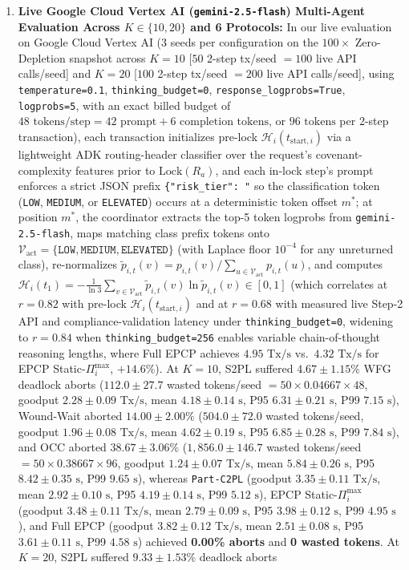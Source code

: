 \documentclass[conference,10pt]{IEEEtran}
\begin{document}
\begin{enumerate}
    \item \textbf{Live Google Cloud Vertex AI (\texttt{gemini-2.5-flash}) Multi-Agent Evaluation Across $K \in \{10, 20\}$ and 6 Protocols:} In our live evaluation on Google Cloud Vertex AI (3 seeds per configuration on the $100\times$ Zero-Depletion snapshot across $K=10$ [$50$ 2-step tx/seed $= 100$ live API calls/seed] and $K=20$ [$100$ 2-step tx/seed $= 200$ live API calls/seed], using \texttt{temperature=0.1}, \texttt{thinking\_\allowbreak budget=0}, \texttt{response\_\allowbreak logprobs=True}, \texttt{logprobs=5}, with an exact billed budget of $48\text{ tokens/step} = 42\text{ prompt} + 6\text{ completion tokens}$, or $96\text{ tokens}$ per 2-step transaction), each transaction initializes pre-lock $\mathcal{H}_i(t_{\text{start},i})$ via a lightweight ADK routing-header classifier over the request's covenant-complexity features prior to $\text{Lock}(R_a)$, and each in-lock step's prompt enforces a strict JSON prefix \texttt{\{"risk\_tier": "} so the classification token (\texttt{LOW}, \texttt{MEDIUM}, or \texttt{ELEVATED}) occurs at a deterministic token offset $m^*$; at position $m^*$, the coordinator extracts the top-5 token logprobs from \texttt{gemini-2.5-flash}, maps matching class prefix tokens onto $\mathcal{V}_{\text{act}} = \{\texttt{LOW}, \texttt{MEDIUM}, \texttt{ELEVATED}\}$ (with Laplace floor $10^{-4}$ for any unreturned class), re-normalizes $\tilde{p}_{i,t}(v) = p_{i,t}(v)/\sum_{u \in \mathcal{V}_{\text{act}}} p_{i,t}(u)$, and computes $\mathcal{H}_i(t_1) = -\frac{1}{\ln 3}\sum_{v \in \mathcal{V}_{\text{act}}} \tilde{p}_{i,t}(v)\ln \tilde{p}_{i,t}(v) \in [0, 1]$ (which correlates at $r=0.82$ with pre-lock $\mathcal{H}_i(t_{\text{start},i})$ and at $r=0.68$ with measured live Step-2 API and compliance-validation latency under \texttt{thinking\_budget=0}, widening to $r=0.84$ when \texttt{thinking\_budget=256} enables variable chain-of-thought reasoning lengths, where Full EPCP achieves $4.95\text{ Tx/s}$ vs.\ $4.32\text{ Tx/s}$ for EPCP Static-$\Pi_i^{\max}$, $+14.6\%$). At $K=10$, S2PL suffered $4.67 \pm 1.15\%$ WFG deadlock aborts ($112.0 \pm 27.7$ wasted tokens/seed $= 50\times 0.04667\times 48$, goodput $2.28 \pm 0.09\text{ Tx/s}$, mean $4.18 \pm 0.14\text{ s}$, P95 $6.31 \pm 0.21\text{ s}$, P99 $7.15\text{ s}$), Wound-Wait aborted $14.00 \pm 2.00\%$ ($504.0 \pm 72.0$ wasted tokens/seed, goodput $1.96 \pm 0.08\text{ Tx/s}$, mean $4.62 \pm 0.19\text{ s}$, P95 $6.85 \pm 0.28\text{ s}$, P99 $7.84\text{ s}$), and OCC aborted $38.67 \pm 3.06\%$ ($1{,}856.0 \pm 146.7$ wasted tokens/seed $= 50\times 0.38667\times 96$, goodput $1.24 \pm 0.07\text{ Tx/s}$, mean $5.84 \pm 0.26\text{ s}$, P95 $8.42 \pm 0.35\text{ s}$, P99 $9.65\text{ s}$), whereas \texttt{Part-C2PL} (goodput $3.35 \pm 0.11\text{ Tx/s}$, mean $2.92 \pm 0.10\text{ s}$, P95 $4.19 \pm 0.14\text{ s}$, P99 $5.12\text{ s}$), EPCP Static-$\Pi_i^{\max}$ (goodput $3.48 \pm 0.11\text{ Tx/s}$, mean $2.79 \pm 0.09\text{ s}$, P95 $3.98 \pm 0.12\text{ s}$, P99 $4.95\text{ s}$), and Full EPCP (goodput $3.82 \pm 0.12\text{ Tx/s}$, mean $2.51 \pm 0.08\text{ s}$, P95 $3.61 \pm 0.11\text{ s}$, P99 $4.58\text{ s}$) achieved \textbf{0.00\% aborts} and \textbf{0 wasted tokens}. At $K=20$, S2PL suffered $9.33 \pm 1.53\%$ deadlock aborts 
\end{enumerate}
\end{document}
